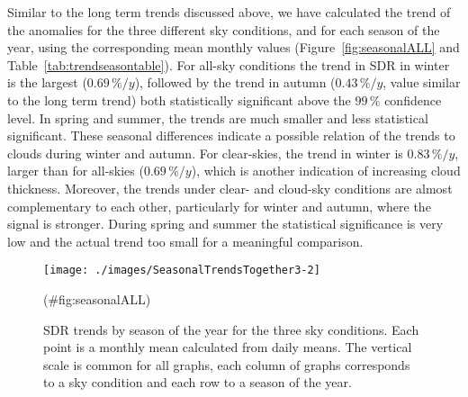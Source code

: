 \documentclass[
  preprint, 3p, authoryear]{article}
\begin{document}
Similar to the long term trends discussed above, we have calculated the trend of the anomalies for the three different sky conditions, and for each season of the year, using the corresponding mean monthly values
(Figure~\ref{fig:seasonalALL} and Table~\ref{tab:trendseasontable}).
For all-sky conditions the trend in SDR in winter is the largest
(\(0.69\,\%/y\)),
followed by the trend in autumn
(\(0.43\,\%/y\),
value similar to the long term trend) both statistically significant above the \(99\,\%\) confidence level.
In spring and summer, the trends are much smaller and less statistical significant.
These seasonal differences indicate a possible relation of the trends to clouds during winter and autumn.
For clear-skies, the trend in winter is \(0.83\,\%/y\), larger than for all-skies (\(0.69\,\%/y\)), which is another indication of increasing cloud thickness.
Moreover, the trends under clear- and cloud-sky conditions are almost complementary to each other, particularly for winter and autumn, where the signal is stronger.
During spring and summer the statistical significance is very low and the actual trend too small for a meaningful comparison.

\begin{figure}[h!]

{\centering \texttt{[image: ./images/SeasonalTrendsTogether3-2]} 

}

\caption{SDR trends by season of the year for the three sky conditions. Each point is a monthly mean calculated from daily means. The vertical scale is common for all graphs, each column of graphs corresponds to a sky condition and each row to a season of the year.}(\#fig:seasonalALL)
\end{figure}
\end{document}
